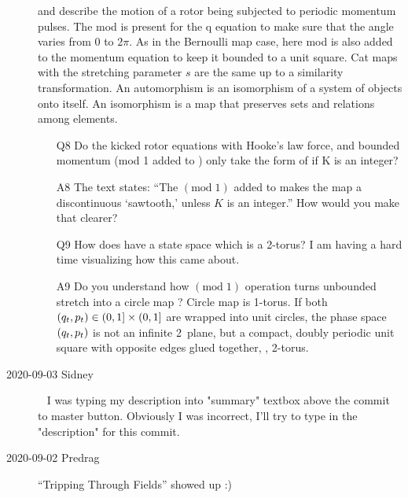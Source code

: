 \begin{description}
and  describe the motion of a rotor being subjected to
periodic momentum pulses. The mod is present for the q equation to make
sure that the angle varies from $0$ to $2\pi$. As in the Bernoulli map case,
here
mod is also added to the momentum equation to keep it bounded to a unit
square. Cat maps with the stretching parameter ${s}$ are the same up to a
similarity transformation. An automorphism is an isomorphism of a system
of objects onto itself. An isomorphism is a map that preserves sets and
relations among elements.

\begin{itemize}
	\item[Q8]
Do the kicked rotor equations with Hooke's law force, and bounded momentum (mod 1 added to ) only take the form of  if K is an integer?
	\item[A8]
The text states: ``The
$(\mbox{mod}\;1)$ added to  makes the map a
discontinuous `sawtooth,' unless $K$ is an integer.'' How would you make that clearer?
	\item[Q9]
How does  have a state space which is a 2-torus? I am having a hard time visualizing how this came about.
	\item[A9]
Do you understand how  $(\mbox{mod}\;1)$ operation turns unbounded stretch
 into a circle map ? Circle map is
1-torus. If both
\(
(q_{t},p_{t}) \in  (0,1]\times(0,1]
\)
are wrapped into unit circles, the phase space $(q_{t},p_{t})$
is not an infinite 2\dmn\ plane, but a compact, doubly periodic unit square with
opposite edges glued together, \ie, 2-torus.
\end{itemize}


\item[2020-09-03 Sidney]~
I was typing my description into "summary" textbox above the commit to
master button. Obviously I was incorrect, I'll try to type in the
"description" for this commit.

\item[2020-09-02 Predrag]
``Tripping Through Fields'' showed up :)


\end{description}
